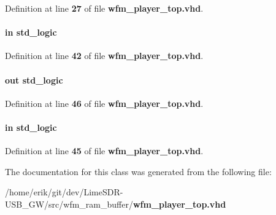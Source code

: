 Definition at line {\bf 27} of file {\bf wfm\+\_\+player\+\_\+top.\+vhd}.

\paragraph[{wfm\+\_\+play\+\_\+stop}]{ {\bfseries \textcolor{keywordflow}{in}\textcolor{vhdlchar}{ }} {\bfseries \textcolor{comment}{std\+\_\+logic}\textcolor{vhdlchar}{ }} \hspace{0.3cm}{\ttfamily [Port]}}\label{classwfm__player__top_aec820bcf21fff0d393f59c1e0478385c}


Definition at line {\bf 42} of file {\bf wfm\+\_\+player\+\_\+top.\+vhd}.

\paragraph[{wfm\+\_\+rdy}]{ {\bfseries \textcolor{keywordflow}{out}\textcolor{vhdlchar}{ }} {\bfseries \textcolor{comment}{std\+\_\+logic}\textcolor{vhdlchar}{ }} \hspace{0.3cm}{\ttfamily [Port]}}\label{classwfm__player__top_a9b46e10b7437f896c24b2c96ceca8b71}


Definition at line {\bf 46} of file {\bf wfm\+\_\+player\+\_\+top.\+vhd}.

\paragraph[{wfm\+\_\+wr}]{ {\bfseries \textcolor{keywordflow}{in}\textcolor{vhdlchar}{ }} {\bfseries \textcolor{comment}{std\+\_\+logic}\textcolor{vhdlchar}{ }} \hspace{0.3cm}{\ttfamily [Port]}}\label{classwfm__player__top_abae12bc639de975267fe45630d50f5fb}


Definition at line {\bf 45} of file {\bf wfm\+\_\+player\+\_\+top.\+vhd}.



The documentation for this class was generated from the following file\+:\begin{DoxyCompactItemize}
\item 
/home/erik/git/dev/\+Lime\+S\+D\+R-\/\+U\+S\+B\+\_\+\+G\+W/src/wfm\+\_\+ram\+\_\+buffer/{\bf wfm\+\_\+player\+\_\+top.\+vhd}\end{DoxyCompactItemize}

